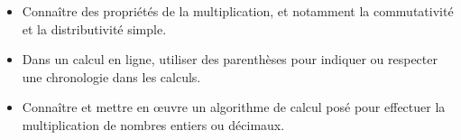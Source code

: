 \begin{prerequis}    
    \begin{itemize}                
        \item[\emoji{red-heart}]    Connaître des propriétés de la multiplication, et notamment la commutativité et la distributivité simple.
        \item[\emoji{diamond-suit}]    Dans un calcul en ligne, utiliser des parenthèses pour indiquer ou respecter une chronologie dans les calculs.
        \item[\emoji{diamond-suit}] Connaître et mettre en œuvre un algorithme de calcul posé pour effectuer la multiplication de nombres entiers ou décimaux.
    \end{itemize}
\end{prerequis}
